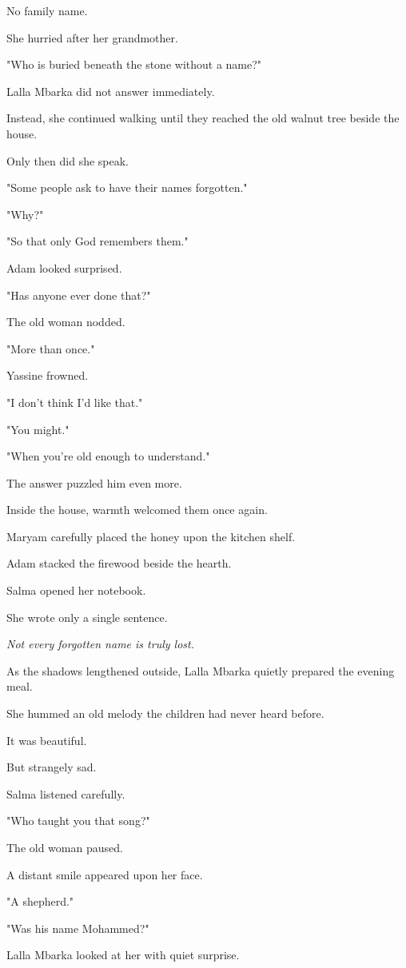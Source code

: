 \documentclass[12pt,openany]{book}
\begin{document}
No family name.

She hurried after her grandmother.

"Who is buried beneath the stone without a name?"

Lalla Mbarka did not answer immediately.

Instead, she continued walking until they reached the old walnut tree beside the house.

Only then did she speak.

"Some people ask to have their names forgotten."

"Why?"

"So that only God remembers them."

Adam looked surprised.

"Has anyone ever done that?"

The old woman nodded.

"More than once."

Yassine frowned.

"I don't think I'd like that."

"You might."

"When you're old enough to understand."

The answer puzzled him even more.

Inside the house, warmth welcomed them once again.

Maryam carefully placed the honey upon the kitchen shelf.

Adam stacked the firewood beside the hearth.

Salma opened her notebook.

She wrote only a single sentence.

\emph{Not every forgotten name is truly lost.}

As the shadows lengthened outside, Lalla Mbarka quietly prepared the evening meal.

She hummed an old melody the children had never heard before.

It was beautiful.

But strangely sad.

Salma listened carefully.

"Who taught you that song?"

The old woman paused.

A distant smile appeared upon her face.

"A shepherd."

"Was his name Mohammed?"

Lalla Mbarka looked at her with quiet surprise.
\end{document}
